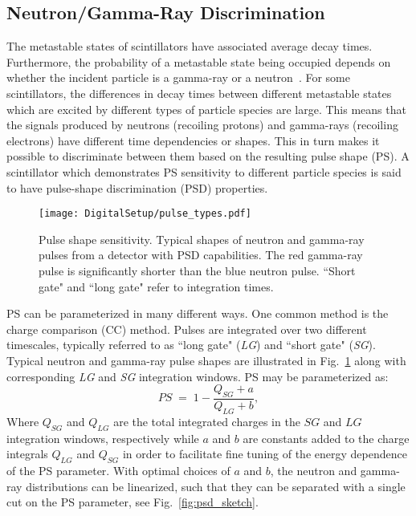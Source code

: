 \documentclass[main.tex]{subfiles}
\begin{document}
\subsection{Neutron/Gamma-Ray Discrimination}\label{sec:psd}
The metastable states of scintillators have associated average decay times. 
Furthermore, the probability of a metastable state being occupied depends on whether the incident particle is a gamma-ray or a neutron~\cite{Krane}. For some scintillators, the differences in decay times between different metastable states which are excited by different types of particle species are large. This means that the signals produced by neutrons (recoiling protons) and gamma-rays (recoiling electrons) have different time dependencies or shapes. This in turn makes it possible to discriminate between them based on the resulting pulse shape (PS). A scintillator which demonstrates PS sensitivity to different particle species is said to have pulse-shape discrimination (PSD) properties.
\begin{figure}[ht]
	\centering
    	\texttt{[image: DigitalSetup/pulse\_types.pdf]}
        \caption[Pulse shape sensitivity.]{Pulse shape sensitivity. Typical shapes of neutron and gamma-ray pulses from a detector with PSD capabilities. The red gamma-ray pulse is significantly shorter than the blue neutron pulse. ``Short gate" and ``long gate" refer to integration times.}
	    \label{fig:pulse_types} 
\end{figure}

PS can be parameterized in many different ways. One common method is the charge comparison (CC) method. Pulses are integrated over two different timescales, typically referred to as ``long gate" (\textit{LG}) and ``short gate" (\textit{SG}). Typical neutron and gamma-ray pulse shapes are illustrated in Fig.~\ref{fig:pulse_types} along with corresponding \textit{LG} and \textit{SG} integration windows. PS may be parameterized as:
\begin{equation}
	PS \; = \; 1-\frac{Q_{SG} + a}{Q_{LG} + b},
	\label{eq:ps}
\end{equation}
Where $Q_{SG}$ and $Q_{LG}$ are the total integrated charges in the $SG$ and $LG$ integration windows, respectively while $a$ and $b$ are constants added to the charge integrals $Q_{LG}$ and $Q_{SG}$ in order to facilitate fine tuning of the energy dependence of the PS parameter. 
With optimal choices of $a$ and $b$, the neutron and gamma-ray distributions can be linearized, such that they can be separated with a single cut on the PS parameter, see Fig.~\ref{fig:psd_sketch}.
\end{document}
